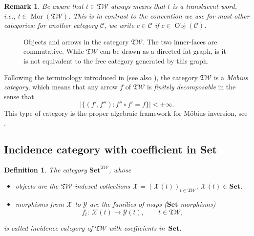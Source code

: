 \documentclass[pdftex]{sigma}
\newcommand{\SWc}{{\mathfrak{T}\mathcal{W}}}
\newcommand\LL{{\mathsf{L}}}
\newcommand\RR{{\mathsf{R}}}
\newcommand\CAT[1]{\mathbf{#1}}
\newcommand{\Set}{\CAT{Set}}
\numberwithin{equation}{section}
\newtheorem{Definition}[Theorem]{Definition}
\newtheorem{Remark}[Theorem]{Remark}
\begin{document}
\begin{Remark}
 Be aware that $t\in \SWc$ always means that $t$ is a translucent word, i.e., $t\in \operatorname{Mor}(\SWc)$. This is in contrast to the convention we use for most other categories; for another category $\mathcal C$, we write $c\in \mathcal C$ if $c\in \operatorname{Obj}(\mathcal C)$.
\end{Remark}

\begin{figure}[!ht]	\centering
	\caption{Objects and arrows in the category $\SWc$. The two inner-faces are commutative. While $\SWc$ can be drawn as a directed fat-graph, is it is not equivalent to the free category generated by this graph.}\label{fig:objectsarrows}
\end{figure}

Following the terminology introduced in \cite{content1980categories} (see also \cite{dur1986mobius,leinster2012notions}), the category $\SWc$ is a \emph{M\"obius category}, which means that any arrow $f$ of $\SWc$ is \emph{finitely decomposable} in the sense that
\[
	\big|\bigl\{(f',f'')\colon f'' \circ f' = f \bigr\}\big| < +\infty.
\]
This type of category is the proper algebraic framework for M\"obius inversion, see \cite{content1980categories}.

\subsection{Incidence category with coefficient in Set}\label{subsec:monoidalindexedmord-set}

\begin{Definition}
 The category $\Set^{\SWc}$, whose
\begin{itemize}\itemsep=0pt
 \item objects are the {\it $\SWc$-indexed collections}
	$\mathcal{X}=(\mathcal{X}(t))_{t \in \SWc}$, $\mathcal{X}(t) \in \Set$.
	\item morphisms from $\mathcal{X}$ to $\mathcal{Y}$
are the families of maps ($\Set$ morphisms)
\[f_{t}\colon \ \mathcal{X}(t) \to \mathcal{Y}(t),\qquad t \in \SWc,\]
\end{itemize}
is called {\it incidence category of $\SWc$ with coefficients in~$\Set$}.
\end{Definition}
\end{document}
